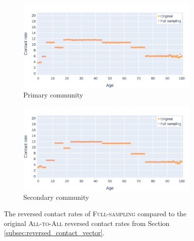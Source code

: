 \begin{figure}\ContinuedFloat
    \centering
    \begin{subfigure}{.8\linewidth}
        \centering
        \includegraphics[width=\textwidth]{4 - Sampling/fig/full_sampling/fs_pType_vs_standard_reverse_cr_primary.png}
        \caption{Primary community}
        \label{fig:fs_pType_vs_standard_reversed_cr_primary}
    \end{subfigure}
    \begin{subfigure}{.8\linewidth}
        \centering
        \includegraphics[width=\textwidth]{4 - Sampling/fig/full_sampling/fs_pType_vs_standard_reverse_cr_secondary.png}
        \caption{Secondary community}
        \label{fig:fs_pType_vs_standard_reversed_cr_secondary}
    \end{subfigure}
    \caption{The reversed contact rates of \textsc{Full-sampling} compared to the original \textsc{All-to-All} reversed contact rates from Section \ref{subsec:reversed_contact_vector}.}
    \label{fig:fs_pType_vs_standard_reversed_cr}
\end{figure}


